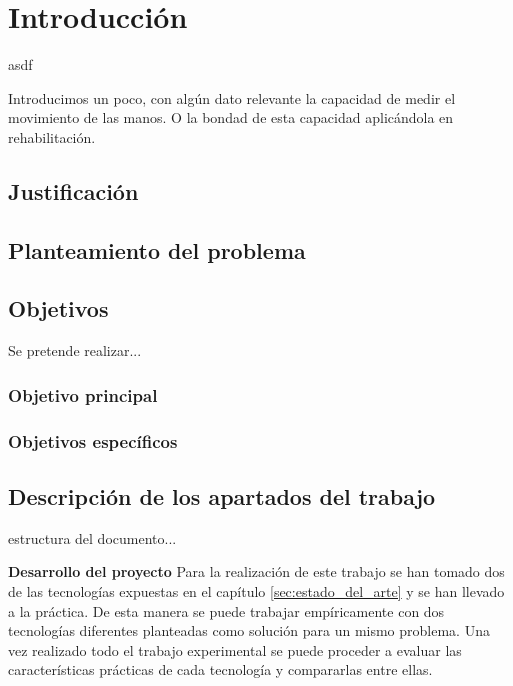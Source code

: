 \chapter{Introducción}

asdf

Introducimos un poco, con algún dato relevante la capacidad de medir el movimiento de las manos. 
O la bondad de esta capacidad aplicándola en rehabilitación.


\section{Justificación}
\label{sec:justificacion1}

\section{Planteamiento del problema}
\label{sec:planteamiento1}

\section{Objetivos}
\label{sec:objetivos1}
Se pretende realizar...

\subsection{Objetivo principal}
\label{sec:objPrinc1}

\subsection{Objetivos específicos}
\label{sec:objEspec1}


\section{Descripción de los apartados del trabajo}
\label{sec:disposicion1}

estructura del documento...

\textbf{Desarrollo del proyecto}
Para la realización de este trabajo se han tomado dos de las tecnologías expuestas en el capítulo \ref{sec:estado_del_arte} y se han llevado a la práctica. De esta manera se puede trabajar empíricamente con dos tecnologías diferentes planteadas como solución para un mismo problema. Una vez realizado todo el trabajo experimental se puede proceder a evaluar las características prácticas de cada tecnología y compararlas entre ellas. 


